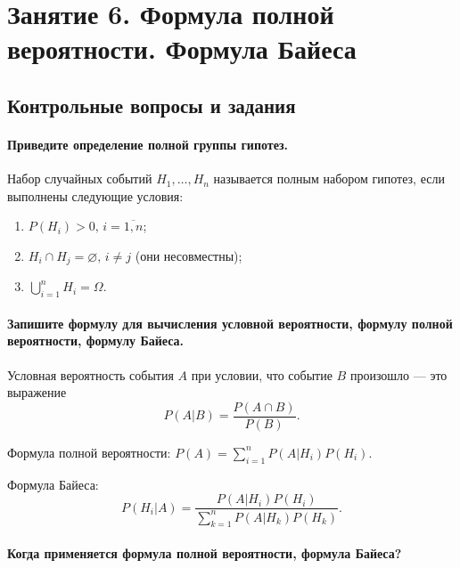 \chapter*{Занятие 6. Формула полной вероятности. Формула Байеса}

\section*{Контрольные вопросы и задания}

\subsubsection*{Приведите определение полной группы гипотез.}

Набор случайных событий $H_1, \dotsc, H_n$ называется полным набором гипотез, если выполнены следующие условия:
\begin{enumerate}
\item $P \left( H_i \right) > 0, \, i = \overline{1, n} $;
\item $H_i \cap H_j = \varnothing, \, i \neq j$ (они несовместны);
\item $ \bigcup \limits_{i=1}^n H_i = \Omega $.
\end{enumerate}

\subsubsection*{Запишите формулу для вычисления условной вероятности, формулу полной вероятности, формулу Байеса.}

Условная вероятность события $A$ при условии, что событие $B$ произошло --- это выражение
$$P \left( \left. A \right| B \right) =
\frac{P \left( A \cap B \right) }{P \left( B \right) }.$$

Формула полной вероятности: $P \left( A \right) = \sum \limits_{i=1}^n P \left( \left. A \right| H_i \right) P \left( H_i \right) $.

Формула Байеса:
$$P \left( \left. H_i \right| A \right) =
\frac{P \left( \left. A \right| H_i \right) P \left( H_i \right) }{ \sum \limits_{k=1}^n P \left( \left. A \right| H_k \right) P \left( H_k \right) }.$$

\subsubsection*{Когда применяется формула полной вероятности, формула Байеса?}

